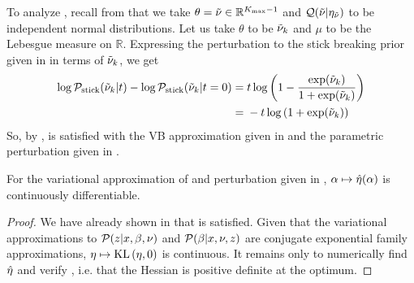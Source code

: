 \begin{ex}
%
To analyze , recall from 
that we take $\theta = \tilde{\nu} \in \mathbb{R}^{{K_{\mathrm{max}}} - 1}$ and $\mathcal{Q}(\tilde{\nu} \vert \eta_{\tilde{\nu}})$ to
be independent normal distributions.  Let us take $\theta$ to be $\tilde{\nu}_{k}$ and
$\mu$ to be the Lebesgue measure on $\mathbb{R}$.  Expressing the perturbation
to the stick breaking prior given in  in terms of
$\tilde{\nu}_{k}$, we get
%
\begin{align*}
%
\log \pstick(\lnuk \vert \t) - \log \pstick(\lnuk \vert \t=0) ={}&
%
\t \log\left(1 - \frac{\exp(\lnuk)}{1 + \exp(\lnuk)}\right)
\\={}&
-\t \log\left(1 + \exp(\lnuk)\right)
%
\end{align*}
%
So, by ,  is satisfied with
the VB approximation given in  and the parametric
perturbation given in .
%
\end{ex}




\begin{cor}
%
For the variational approximation of  and perturbation
given in , $\alpha \mapsto \hat\eta(\alpha)$
is continuously differentiable.
%
\begin{proof}
%
We have already shown in  that  is
satisfied.  Given that the variational approximations to $\mathcal{P}(z \vert x, \beta,
\nu)$ and $\mathcal{P}(\beta \vert x, \nu, z)$ are conjugate exponential family
approximations, $\eta \mapsto \mathrm{KL}\left(\eta, 0\right)$ is continuous.  It remains only to
numerically find $\hat\eta$ and verify , i.e.
that the Hessian is positive definite at the optimum.
%
\end{proof}
%
\end{cor}


